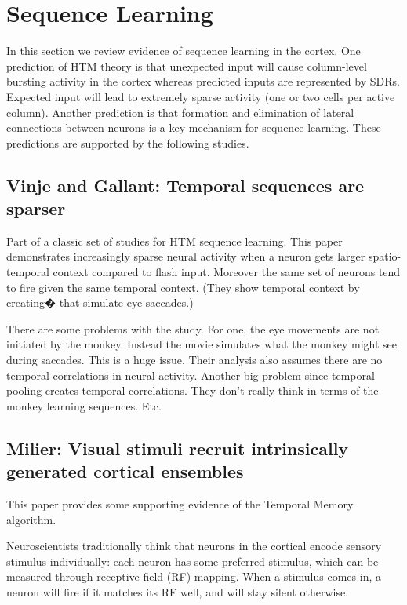 \documentclass{article} %
\begin{document}
\section{Sequence Learning}

In this section we review evidence of sequence learning in the cortex. One
prediction of HTM theory is that unexpected input will cause  column-level
bursting  activity in the cortex whereas predicted inputs are represented by
SDRs. Expected input will lead to extremely sparse activity (one or two cells
per active column). Another prediction is that formation and elimination of
lateral connections between neurons is a key mechanism for sequence
learning. These predictions are supported by the following studies.

\subsection{Vinje and Gallant: Temporal sequences are sparser}

Part of a classic set of studies for HTM sequence learning. This paper
\cite{Vinje2002}
demonstrates increasingly sparse neural activity when a neuron gets larger
spatio-temporal context compared to flash input. Moreover the same set of
neurons tend to fire given the same temporal context. (They show temporal
context by creating� that simulate eye saccades.)

There are some problems with the study. For one, the eye movements are not
initiated by the monkey. Instead the movie simulates what the monkey might see
during saccades. This is a huge issue. Their analysis also assumes there are no
temporal correlations in neural activity. Another big problem since temporal
pooling creates temporal correlations. They don't really think in terms of the
monkey learning sequences. Etc.

\subsection{Milier: Visual stimuli recruit intrinsically generated cortical ensembles}

This paper \cite{Miller2014} provides some supporting evidence of the Temporal Memory algorithm. 

Neuroscientists traditionally think that neurons in the cortical encode sensory
stimulus individually: each neuron has some preferred stimulus, which can be
measured through receptive field (RF) mapping. When a stimulus comes in, a
neuron will fire if it matches its RF well, and will stay silent otherwise.
\end{document}
